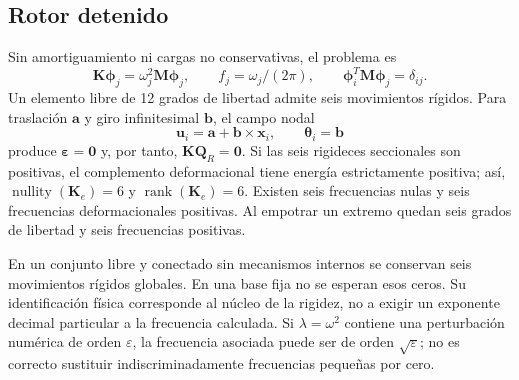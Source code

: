 \documentclass[oneside,a4paper,spanish,links,pagenumbers]{amca}
\begin{document}
\subsection{Rotor detenido}
Sin amortiguamiento ni cargas no conservativas, el problema es
\begin{equation}
\bm K\bm\phi_j=\omega_j^2\bm M\bm\phi_j,
\qquad f_j=\omega_j/(2\pi),
\qquad \bm\phi_i^T\bm M\bm\phi_j=\delta_{ij}.
\end{equation}
Un elemento libre de 12 grados de libertad admite seis movimientos rígidos. Para traslación $\bm a$ y giro infinitesimal $\bm b$, el campo nodal
\begin{equation}
\bm u_i=\bm a+\bm b\times\bm x_i,
\qquad \bm\theta_i=\bm b
\end{equation}
produce $\bm\varepsilon=\bm0$ y, por tanto, $\bm K\bm Q_R=\bm0$. Si las seis rigideces seccionales son positivas, el complemento deformacional tiene energía estrictamente positiva; así, $\operatorname{nullity}(\bm K_e)=6$ y $\operatorname{rank}(\bm K_e)=6$. Existen seis frecuencias nulas y seis frecuencias deformacionales positivas. Al empotrar un extremo quedan seis grados de libertad y seis frecuencias positivas.

En un conjunto libre y conectado sin mecanismos internos se conservan seis movimientos rígidos globales. En una base fija no se esperan esos ceros. Su identificación física corresponde al núcleo de la rigidez, no a exigir un exponente decimal particular a la frecuencia calculada. Si $\lambda=\omega^2$ contiene una perturbación numérica de orden $\varepsilon$, la frecuencia asociada puede ser de orden $\sqrt{\varepsilon}$; no es correcto sustituir indiscriminadamente frecuencias pequeñas por cero.
\end{document}
